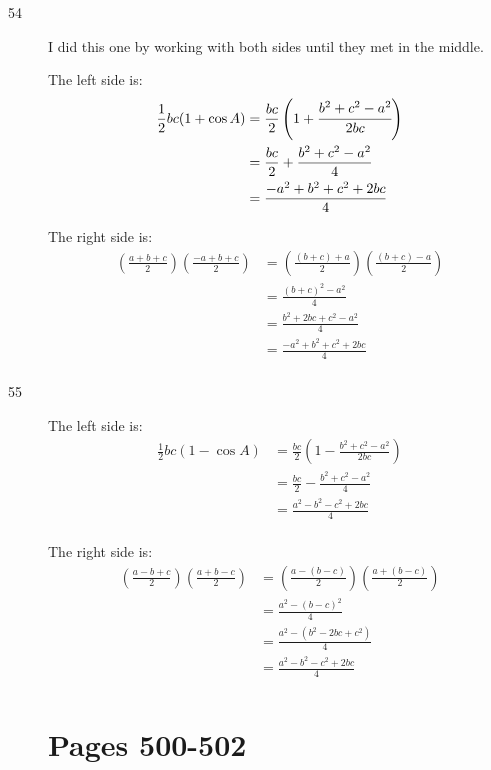\documentclass[fleqn,addpoints]{exam}
\begin{document}
\begin{description}

\item[54]
I did this one by working with both sides until they met in the middle.

The left side is:
\begin{align*}
  \frac{1}{2} bc (1 + \cos A) &=  \frac{bc}{2} \left(1 + \cfrac{b^2 + c^2 - a^2}{2 bc} \right) \\
  &= \frac{bc}{2} + \frac{b^2 + c^2 - a^2}{4} \\
  &= \frac{-a^2 + b^2 + c^2 + 2bc}{4} \\
\end{align*}

The right side is:
\begin{align*}
  \left( \frac{a+b+c}{2} \right)  \left( \frac{-a+b+c}{2} \right) &= \left( \frac{(b+c) + a}{2} \right)  \left( \frac{(b+c) - a}{2} \right) \\
  &= \frac{(b+c)^2 - a^2}{4} \\
  &= \frac{b^2 + 2bc + c^2 - a^2}{4} \\
  &= \frac{-a^2 + b^2 + c^2 + 2bc}{4} \\
\end{align*}

\item[55]
The left side is:
\begin{align*}
  \frac{1}{2} bc (1 - \cos A) &= \frac{bc}{2} \left(1 - \frac{b^2 + c^2 - a^2}{2bc} \right) \\
  &= \frac{bc}{2} - \frac{b^2 + c^2 - a^2}{4} \\
  &= \frac{a^2 - b^2 - c^2 + 2bc}{4} \\
\end{align*}

The right side is:
\begin{align*}
  \left( \frac{a-b+c}{2} \right)  \left( \frac{a+b-c}{2} \right) &= \left( \frac{a - (b-c)}{2} \right)  \left( \frac{a + (b-c)}{2} \right) \\
  &= \frac{a^2 - (b-c)^2}{4} \\
  &= \frac{a^2 - (b^2 -2bc + c^2)}{4} \\
  &= \frac{a^2 - b^2 - c^2 + 2bc}{4} \\
\end{align*}


\ifprintanswers
\section{Pages 500-502}




\end{description}
\end{document}

